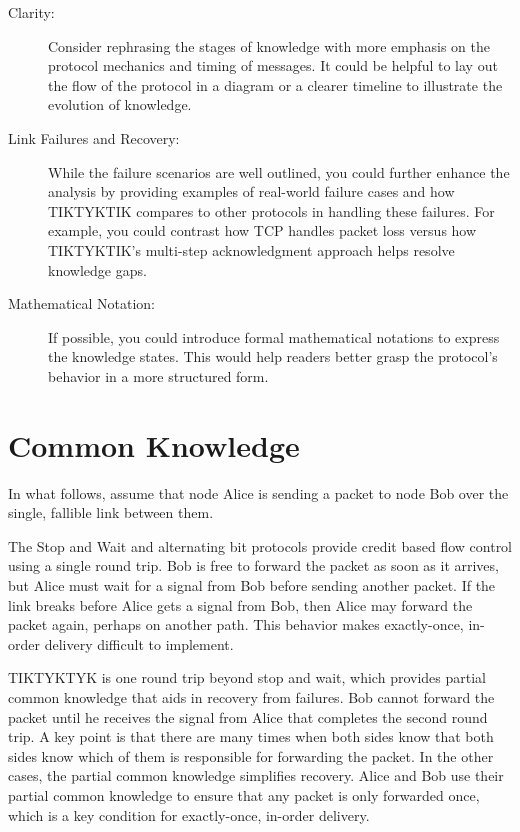 \begin{description}
	\item [Clarity:] Consider rephrasing the stages of knowledge with more emphasis on the protocol mechanics and timing of messages. It could be helpful to lay out the flow of the protocol in a diagram or a clearer timeline to illustrate the evolution of knowledge.
	\item [Link Failures and Recovery:] While the failure scenarios are well outlined, you could further enhance the analysis by providing examples of real-world failure cases and how TIKTYKTIK compares to other protocols in handling these failures. For example, you could contrast how TCP handles packet loss versus how TIKTYKTIK’s multi-step acknowledgment approach helps resolve knowledge gaps.
	\item [Mathematical Notation:]If possible, you could introduce formal mathematical notations to express the knowledge states. This would help readers better grasp the protocol’s behavior in a more structured form.
\end{description}



\section{Common Knowledge}

In what follows, assume that node Alice is sending a packet to node Bob over the single, fallible link between them.

The Stop and Wait and alternating bit protocols provide credit based flow control using a single round trip.  Bob is free to forward the packet as soon as it arrives, but Alice must wait for a signal from Bob before sending another packet.  If the link breaks before Alice gets a signal from Bob, then Alice may forward the packet again, perhaps on another path.  This behavior makes exactly-once, in-order delivery difficult to implement.

TIKTYKTYK is one round trip beyond stop and wait, which provides partial common knowledge that aids in recovery from failures.  Bob cannot forward the packet until he receives the signal from Alice that completes the second round trip.  A key point is that there are many times when both sides know that both sides know which of them is responsible for forwarding the packet.  In the other cases, the partial common knowledge simplifies recovery.  Alice and Bob use their partial common knowledge to ensure that any packet is only forwarded once, which is a key condition for exactly-once, in-order delivery.

